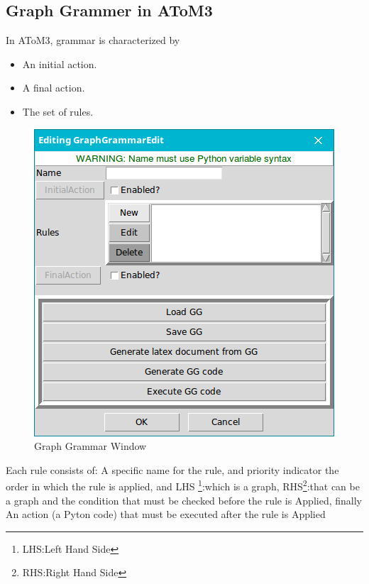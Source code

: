 \subsection{Graph Grammer in AToM3}
In AToM3, grammar is characterized by

\begin{minipage}{0.5\textwidth}

\begin{itemize}
\newcommand{\localtextbulletone}{\textcolor{gray}{\raisebox{.45ex}{\rule{.6ex}{.6ex}}}}
\renewcommand{\labelitemi}{\localtextbulletone}
\item An initial action.
\item A final action.
\item The set of rules. 
\end{itemize}

\end{minipage} \hfill
\begin{minipage}{0.45\textwidth}
\begin{figure}[H]
	\centering 
	\includegraphics[scale=0.5]{ch3/img/GraphGrammar}
	\caption{\label{fig:Graph Grammar Window}Graph Grammar Window}
\end{figure}
\end{minipage}

Each rule consists of: 
A specific name for the rule, and priority indicator the order in which the rule is applied, and LHS \footnote{LHS:Left Hand Side}:which is a graph, RHS\footnote{RHS:Right Hand Side}:that can be a graph and the condition  that must be checked before the rule is Applied, finally  An action (a Pyton code) that must be executed after the rule is
Applied

